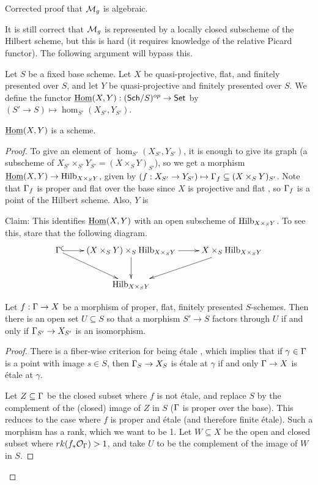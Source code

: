  Corrected proof that $\mathcal{M}_g$ is algebraic.

 It is still correct that $\mathcal{M}_g$ is represented by a locally closed subscheme of the
 Hilbert scheme, but this is hard (it requires knowledge of the relative Picard
 functor). The following argument will bypass this.

 Let $S$ be a fixed base scheme. Let $X$ be quasi-projective, flat, and finitely
 presented over $S$, and let $Y$ be quasi-projective and finitely presented over $S$. We
 define the functor $\operatorname{\underline{Hom}}(X,Y):(\text{\sf Sch}/S)^{op}\to \text{\sf Set}$ by $(S'\to S)\mapsto
 \hom_{S'}(X_{S'},Y_{S'})$.
 \begin{proposition}
   $\operatorname{\underline{Hom}}(X,Y)$ is a scheme.
 \end{proposition}
 \begin{proof}
   To give an element of $\hom_{S'}(X_{S'},Y_{S'})$, it is enough to give its graph (a
    subscheme of $X_{S'}\times_{S'}Y_{S'}=(X\times_S Y)_{S'}$), so we get a morphism
   $\operatorname{\underline{Hom}}(X,Y)\to \operatorname{Hilb}_{X\times_S Y}$, given by $(f:X_{S'}\to Y_{S'})\mapsto
   \Gamma_f\subseteq (X\times_S Y)_{S'}$. Note that $\Gamma_f$ is proper and flat over the base
   since $X$ is projective and flat \anton{}, so $\Gamma_f$ is a point of the Hilbert
   scheme. Also, $Y$ is 

   Claim: This identifies $\operatorname{\underline{Hom}}(X,Y)$ with an open subscheme of $\operatorname{Hilb}_{X\times_S Y}$.
   To see this, stare that the following diagram.
   \[\xymatrix{
    \Ga\ar@{^(->}[r]\ar[dr] & (X\times_S Y)\times_S \hilb_{X\times_S Y}\ar[r]\ar[d] & X\times_S
    \hilb_{X\times_S Y}\ar[dl]\\
    & \hilb_{X\times_S Y}
   }\]
 \begin{lemma}
   Let $f:\Gamma\to X$ be a morphism of proper, flat, finitely presented $S$-schemes. Then
   there is an open set $U\subseteq S$ so that a morphism $S'\to S$ factors through $U$
   if and only if $\Gamma_{S'}\to X_{S'}$ is an isomorphism.
 \end{lemma}
 \begin{proof}
   There is a fiber-wise criterion for being \'etale \cite[IV.17.8.2]{EGA}, which implies
   that if $\gamma\in \Gamma$ is a point with image $s\in S$, then $\Gamma_S\to X_S$ is \'etale
   at $\gamma$ if and only $\Gamma\to X$ is \'etale at $\gamma$.

   Let $Z\subseteq \Gamma$ be the closed subset where $f$ is not \'etale, and replace $S$ by
   the complement of the (closed) image of $Z$ in $S$ ($\Gamma$ is proper over the base).
   This reduces to the case where $f$ is proper and \'etale (and therefore finite
   \'etale). Such a morphism has a rank, which we want to be 1. Let $W\subseteq X$ be the
   open and closed \anton{} subset where $rk(f_*\mathcal{O}_\Gamma)>1$, and take $U$ to be the
   complement of the image of $W$ in $S$.
 \renewcommand{\qedsymbol}{$\square_\text{Lemma}$}
 \end{proof}
 \end{proof}

